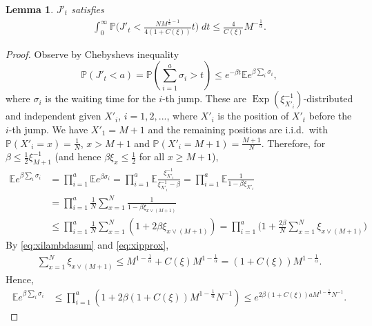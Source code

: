\documentclass[11pt,a4paper]{scrartcl}
\numberwithin{equation}{section}
\theoremstyle{plain}
\newtheorem{lemma}[theorem]{Lemma}
\theoremstyle{definition}
\theoremstyle{remark}
\newcommand{\bE}{\ensuremath{\mathbb{E}}}
\newcommand{\bP}{\ensuremath{\mathbb{P}}}
\begin{document}
\begin{lemma}\label{lem:5.3}
	$J'_t$ satisfies 
	\begin{align}
		\int_0^\infty \bP\Big(J'_t < \frac{N M^{\frac1\alpha-1} }{4(1+C(\xi))} t \Big)\;dt 
		\leq \frac4{C(\xi)}M^{-\frac1\alpha}.
	\end{align}
\end{lemma}
\begin{proof}
	Observe by Chebyshevs inequality
	\begin{equation}\label{eq:cheby}
	\bP(J'_t < a ) = \bP( \sum_{i=1}^a \sigma_i > t) \leq e^{-\beta t} \bE e^{ \beta\sum_i \sigma_i},
	\end{equation}
where $\sigma_i$ is the waiting time for the $i$-th jump. These are $\operatorname{Exp}(\xi_{X'_i}^{-1})$-distributed and independent given $X'_i$, $i=1,2,...$, where $X'_i$ is the position of $X'_t$ before the $i$-th jump. We have $X'_1=M+1$ and the remaining positions are i.i.d.\ with $\bP(X'_i=x) = \frac1N$, $x>M+1$ and $\bP(X'_i=M+1) = \frac{M+1}N$.
	Therefore, for $\beta\leq \frac12\xi_{M+1}^{-1}$ (and hence $\beta \xi_x\leq \frac12$ for all $x\geq M+1$),
	\begin{align}
		\bE e^{ \beta\sum_i \sigma_i} &= \prod_{i=1}^a \bE e^{ \beta\sigma_i}  
		= \prod_{i=1}^a \bE \frac{\xi_{X'_i}^{-1}}{\xi_{X'_i}^{-1}-\beta} 
		= \prod_{i=1}^a \bE \frac{1}{1-\beta\xi_{X'_i}}  \\
		&= \prod_{i=1}^a \frac1N\sum_{x=1}^N \frac{1}{1-\beta\xi_{x\lor (M+1)}} \\
		&\leq \prod_{i=1}^a \frac1N\sum_{x=1}^N (1+2\beta\xi_{x\lor (M+1)}) 
		= \prod_{i=1}^a \big(1+\frac{2\beta}{N}\sum_{x=1}^N \xi_{x\lor (M+1)}\big)    
	\end{align}
	By \eqref{eq:xilambdasum} and \eqref{eq:xipprox}, 
	\begin{align}
		\sum_{x=1}^N \xi_{x\lor (M+1)} \leq M^{1-\frac1\alpha} + C(\xi)M^{1-\frac1\alpha} = (1+C(\xi))M^{1-\frac1\alpha}.
	\end{align}
	Hence, 
	\begin{align}\label{eq:expo}
		\bE e^{ \beta\sum_i \sigma_i} 
		&\leq \prod_{i=1}^a (1+2\beta(1+C(\xi))M^{1-\frac1\alpha}N^{-1})    
		\leq e^{2\beta(1+C(\xi)) a M^{1-\frac1\alpha} N^{-1} }.
	\end{align}

\end{proof}
\end{document}
